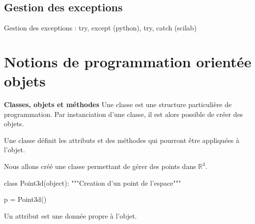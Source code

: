 \documentclass[11pt,oneside]{article}
\begin{document}
\begin{exemple}
\begin{minipage}[c]{.45\linewidth}
\begin{python}[moreemph={[4], 46, 48}]

\end{python}
\end{minipage}\hfill
\begin{minipage}[c]{.45\linewidth}
\end{minipage}

\end{exemple}

\subsection{Gestion des exceptions}
Gestion des exceptions : try, except (python), try, catch (scilab)



\section{Notions de programmation orientée objets}
\begin{defi}
\textbf{Classes, objets et méthodes}
Une classe est une structure particulière de programmation. Par instanciation d'une classe, il est alors possible de créer des objets. 

Une classe définit les attributs et des méthodes qui pourront être appliquées à l'objet.
\end{defi}

\begin{exemple}

Nous allons créé une classe permettant de gérer des points dans $\mathbb{R}^3$.

\begin{minipage}[c]{.9\linewidth}
\begin{py}
\begin{python}
class Point3d(object):
	"""Creation d'un point de l'espace"""

p = Point3d()
\end{python}
\end{py}
\end{minipage}
\end{exemple}

\begin{defi}
Un attribut est une donnée propre à l'objet.
\end{defi}
\end{document}

